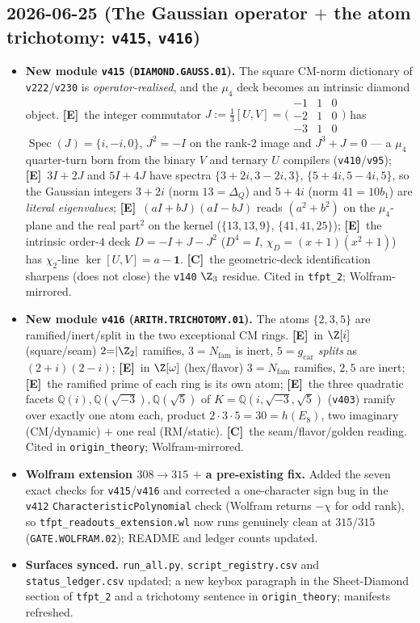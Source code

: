 \documentclass[11pt]{article}
\providecommand{\mE}{\textbf{[E]}}\providecommand{\mC}{\textbf{[C]}}
\providecommand{\vref}[1]{\texttt{#1}}
\providecommand{\gcar}{g_{\mathrm{car}}}\providecommand{\Nfam}{N_{\mathrm{fam}}}
\begin{document}
\subsection*{2026-06-25 (The Gaussian operator $+$ the atom trichotomy: \texttt{v415}, \texttt{v416})}
\begin{itemize}
\item \textbf{New module \texttt{v415} (\texttt{DIAMOND.GAUSS.01}).} The square CM-norm dictionary of
\vref{v222}/\vref{v230} is \emph{operator-realised}, and the $\mu_4$ deck becomes an intrinsic diamond
object. \mE\ the integer commutator $J:=\tfrac13[U,V]=\big(\begin{smallmatrix}-1&1&0\\-2&1&0\\-3&1&0\end{smallmatrix}\big)$
has $\operatorname{Spec}(J)=\{i,-i,0\}$, $J^2=-I$ on the rank-$2$ image and $J^3+J=0$ --- a $\mu_4$
quarter-turn born from the binary $V$ and ternary $U$ compilers (\vref{v410}/\vref{v95}); \mE\ $3I+2J$ and
$5I+4J$ have spectra $\{3{+}2i,3{-}2i,3\}$, $\{5{+}4i,5{-}4i,5\}$, so the Gaussian integers $3{+}2i$ (norm
$13{=}\Delta_Q$) and $5{+}4i$ (norm $41{=}10b_1$) are \emph{literal eigenvalues}; \mE\ $(aI{+}bJ)(aI{-}bJ)$
reads $(a^2{+}b^2)$ on the $\mu_4$-plane and the real part$^2$ on the kernel ($\{13,13,9\}$, $\{41,41,25\}$);
\mE\ the intrinsic order-$4$ deck $D=-I+J-J^2$ ($D^4=I$, $\chi_D=(x{+}1)(x^2{+}1)$) has $\chi_2$-line
$\ker[U,V]=a-\mathbf 1$. \mC\ the geometric-deck identification sharpens (does not close) the \vref{v140}
$\Z_3$ residue. Cited in \texttt{tfpt\_2}; Wolfram-mirrored.
\item \textbf{New module \texttt{v416} (\texttt{ARITH.TRICHOTOMY.01}).} The atoms $\{2,3,5\}$ are
ramified/inert/split in the two exceptional CM rings. \mE\ in $\Z[i]$ (square/seam) $2{=}|\Z_2|$ ramifies,
$3{=}\Nfam$ is inert, $5{=}\gcar$ \emph{splits} as $(2{+}i)(2{-}i)$; \mE\ in $\Z[\omega]$ (hex/flavor)
$3{=}\Nfam$ ramifies, $2,5$ are inert; \mE\ the ramified prime of each ring is its own atom; \mE\ the three
quadratic facets $\mathbb Q(i),\mathbb Q(\sqrt{-3}),\mathbb Q(\sqrt5)$ of $K=\mathbb Q(i,\sqrt{-3},\sqrt5)$
(\vref{v403}) ramify over exactly one atom each, product $2\cdot3\cdot5=30=h(E_8)$, two imaginary
(CM/dynamic) $+$ one real (RM/static). \mC\ the seam/flavor/golden reading. Cited in
\texttt{origin\_theory}; Wolfram-mirrored.
\item \textbf{Wolfram extension $308\to315$ $+$ a pre-existing fix.} Added the seven exact checks for
\texttt{v415}/\texttt{v416} and corrected a one-character sign bug in the \texttt{v412}
\texttt{CharacteristicPolynomial} check (Wolfram returns $-\chi$ for odd rank), so
\texttt{tfpt\_readouts\_extension.wl} now runs genuinely clean at $315/315$ (\texttt{GATE.WOLFRAM.02});
README and ledger counts updated.
\item \textbf{Surfaces synced.} \texttt{run\_all.py}, \texttt{script\_registry.csv} and
\texttt{status\_ledger.csv} updated; a new keybox paragraph in the Sheet-Diamond section of \texttt{tfpt\_2}
and a trichotomy sentence in \texttt{origin\_theory}; manifests refreshed.
\end{itemize}
\end{document}
